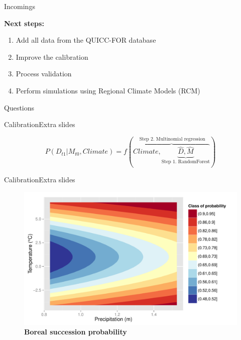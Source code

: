 \documentclass[10pt,aspectratio=149]{beamer}
\begin{document}
\begin{frame}{Incomings}

\textbf{Next steps:}
\begin{enumerate}
	\item Add all data from the QUICC-FOR database
	\item Improve the calibration
	\item Process validation 
	\item Perform simulations using Regional Climate Models (RCM)
\end{enumerate}

\end{frame}


\begin{frame}[plain]{Questions}



\end{frame}







\begin{frame}{Calibration}{Extra slides}

	\begin{equation}
		P(D_{t1}|M_{t0}, Climate) = f(\overbrace{Climate, \underbrace{\hat{D}, \hat{M}}_\text{Step 1. RandomForest}}^\text{ Step 2. Multinomial regression})
	\label{eq1}
	\end{equation}

\end{frame}

\begin{frame}{Calibration}{Extra slides}

            \begin{figure}
              \caption*{\small \textbf{Boreal succession probability}}	
	          \includegraphics[width=0.8\linewidth]{Figs/alphab.pdf}
	        \end{figure}

\end{frame}
\end{document}
